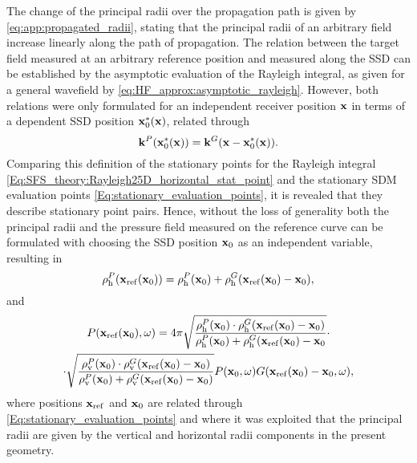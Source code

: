 The change of the principal radii over the propagation path is given by \eqref{eq:app:propagated_radii}, stating that the principal radii of an arbitrary field increase linearly along the path of propagation.
The relation between the target field measured at an arbitrary reference position and measured along the SSD can be established by the asymptotic evaluation of the Rayleigh integral, as given for a general wavefield by \eqref{eq:HF_approx:asymptotic_rayleigh}.
However, both relations were only formulated for an independent receiver position $\mathbf{x}$ in terms of a dependent SSD position $\mathbf{x}_0^*(\mathbf{x})$, related through
\begin{equation}
\label{Eq:SFS_theory:Rayleigh25D_horizontal_stat_point}
\mathbf{k}^P(\mathbf{x}_0^*(\mathbf{x})) = \mathbf{k}^G( \mathbf{x} - \mathbf{x}_0^*(\mathbf{x})).
\end{equation}
Comparing this definition of the stationary points for the Rayleigh integral \eqref{Eq:SFS_theory:Rayleigh25D_horizontal_stat_point} and the stationary SDM evaluation points \eqref{Eq:stationary_evaluation_points}, it is revealed that they describe stationary point pairs.
Hence, without the loss of generality both the principal radii and the pressure field measured on the reference curve can be formulated with choosing the SSD position $\mathbf{x}_0$ as an independent variable, resulting in
\begin{equation}
\label{Eq:principal_radii_addition}
\rho_\mathrm{h}^P(\mathbf{x}_{\mathrm{ref}}(\mathbf{x}_0)) = \rho_\mathrm{h}^P(\mathbf{x}_0) + \rho_\mathrm{h}^G(\mathbf{x}_{\mathrm{ref}}(\mathbf{x}_0)-\mathbf{x}_0),
\end{equation}
and
\small
\begin{multline}
\label{Eq:Asymptotic_Rayleigh_integral}
P(\mathbf{x}_{\mathrm{ref}}(\mathbf{x}_0),\omega) = 
4\pi
\sqrt{\frac{\rho_\mathrm{h}^P(\mathbf{x}_0) \cdot \rho_\mathrm{h}^G(\mathbf{x}_{\mathrm{ref}}(\mathbf{x}_0)-\mathbf{x}_0)}{\rho_\mathrm{h}^P(\mathbf{x}_0) + \rho_\mathrm{h}^G(\mathbf{x}_{\mathrm{ref}}(\mathbf{x}_0)-\mathbf{x}_0}} \cdot \\ \cdot
\sqrt{\frac{\rho_\mathrm{v}^P(\mathbf{x}_0) \cdot \rho_\mathrm{v}^G(\mathbf{x}_{\mathrm{ref}}(\mathbf{x}_0)-\mathbf{x}_0)}{\rho_\mathrm{v}^P(\mathbf{x}_0) + \rho_\mathrm{v}^G(\mathbf{x}_{\mathrm{ref}}(\mathbf{x}_0)-\mathbf{x}_0)}}
P(\mathbf{x}_0,\omega) G(\mathbf{x}_{\mathrm{ref}}(\mathbf{x}_0)-\mathbf{x}_0,\omega)
,
\end{multline} %
\normalsize
where positions $\mathbf{x}_{\mathrm{ref}}$ and $\mathbf{x}_0$ are related through \eqref{Eq:stationary_evaluation_points} and where it was exploited that the principal radii are given by the vertical and horizontal radii components in the present geometry.

